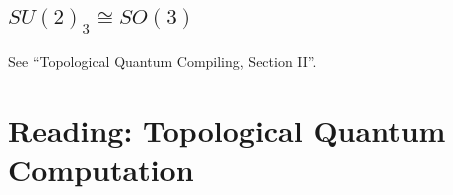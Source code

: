 \documentclass[a4paper,10pt,oneside]{book}
\theoremstyle{plain}
\theoremstyle{definition}
\theoremstyle{remark}
\begin{document}
{%



\section{$SU(2)_3 \cong SO(3)$}

See ``Topological Quantum Compiling, Section II''.







































































\chapter{Reading: Topological Quantum Computation}

}
\end{document}
